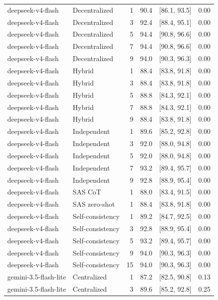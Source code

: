 \begin{tabular}{@{}llrrrr@{}}
deepseek-v4-flash & Decentralized & 1 & 90.4 & [86.1, 93.5] & 0.00 \\
deepseek-v4-flash & Decentralized & 3 & 92.4 & [88.4, 95.1] & 0.00 \\
deepseek-v4-flash & Decentralized & 5 & 94.4 & [90.8, 96.6] & 0.00 \\
deepseek-v4-flash & Decentralized & 7 & 94.4 & [90.8, 96.6] & 0.00 \\
deepseek-v4-flash & Decentralized & 9 & 94.0 & [90.3, 96.3] & 0.00 \\
deepseek-v4-flash & Hybrid & 1 & 88.4 & [83.8, 91.8] & 0.00 \\
deepseek-v4-flash & Hybrid & 3 & 88.4 & [83.8, 91.8] & 0.00 \\
deepseek-v4-flash & Hybrid & 5 & 88.8 & [84.3, 92.1] & 0.00 \\
deepseek-v4-flash & Hybrid & 7 & 88.8 & [84.3, 92.1] & 0.00 \\
deepseek-v4-flash & Hybrid & 9 & 88.4 & [83.8, 91.8] & 0.00 \\
deepseek-v4-flash & Independent & 1 & 89.6 & [85.2, 92.8] & 0.00 \\
deepseek-v4-flash & Independent & 3 & 92.0 & [88.0, 94.8] & 0.00 \\
deepseek-v4-flash & Independent & 5 & 92.0 & [88.0, 94.8] & 0.00 \\
deepseek-v4-flash & Independent & 7 & 93.2 & [89.4, 95.7] & 0.00 \\
deepseek-v4-flash & Independent & 9 & 92.8 & [88.9, 95.4] & 0.00 \\
deepseek-v4-flash & SAS CoT & 1 & 88.0 & [83.4, 91.5] & 0.00 \\
deepseek-v4-flash & SAS zero-shot & 1 & 88.4 & [83.8, 91.8] & 0.00 \\
deepseek-v4-flash & Self-consistency & 1 & 89.2 & [84.7, 92.5] & 0.00 \\
deepseek-v4-flash & Self-consistency & 3 & 92.8 & [88.9, 95.4] & 0.00 \\
deepseek-v4-flash & Self-consistency & 5 & 93.2 & [89.4, 95.7] & 0.00 \\
deepseek-v4-flash & Self-consistency & 9 & 94.0 & [90.3, 96.3] & 0.00 \\
deepseek-v4-flash & Self-consistency & 15 & 94.0 & [90.3, 96.3] & 0.00 \\
gemini-3.5-flash-lite & Centralized & 1 & 87.2 & [82.5, 90.8] & 0.13 \\
gemini-3.5-flash-lite & Centralized & 3 & 89.6 & [85.2, 92.8] & 0.25 \\

\end{tabular}
